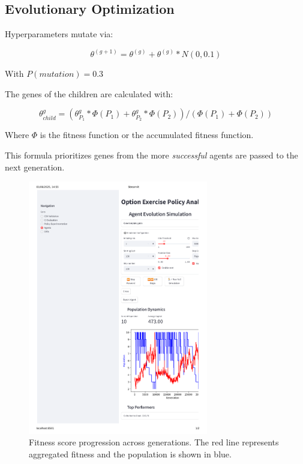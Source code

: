 \documentclass[12pt]{article}
\begin{document}
\subsection{Evolutionary Optimization}
Hyperparameters mutate via:

\begin{equation}
    \theta^{(g+1)} = \theta^{(g)} + \theta^{(g)} * N(0, 0.1)
\end{equation}

With $P(mutation) = 0.3$

The genes of the children are calculated with:

\begin{equation}
    \theta^{g}_{child} = (\theta^{g}_{P_1}*\Phi({P_1}) + \theta^{g}_{P_2}*\Phi({P_2})) / (\Phi({P_1}) + \Phi({P_2}))
\end{equation}

Where $\Phi$ is the fitness function or the accumulated fitness function.

This formula prioritizes genes from the more \emph{successful} agents are passed to the next generation.

\begin{figure}[H]
\centering
\includegraphics[width=0.7\textwidth]{fitness_evolution.pdf}
\caption{Fitness score progression across generations. The red line represents aggregated fitness and the population is shown in blue. }
\label{fig:fitness}
\end{figure}
\end{document}
